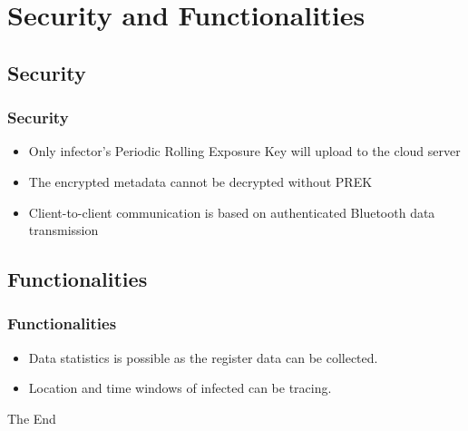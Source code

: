 \documentclass{beamer}
\begin{document}
\subsection{}

\section{Security and Functionalities}
\subsection{Security}
\begin{frame}
  \frametitle{Security}
  \begin{itemize}
    \item Only infector’s Periodic Rolling Exposure Key will upload to the cloud server
    \item The encrypted metadata cannot be decrypted without PREK
    \item Client-to-client communication is based on authenticated Bluetooth data transmission
  \end{itemize}

\end{frame}

\subsection{Functionalities}
\begin{frame}
  \frametitle{Functionalities}
  \begin{itemize}
    \item Data statistics is possible as the register data can be collected.
    \item Location and time windows of infected can be tracing.
  \end{itemize}

\end{frame}


\begin{frame}
\Huge{\centerline{The End}}
\end{frame}

\end{document}
